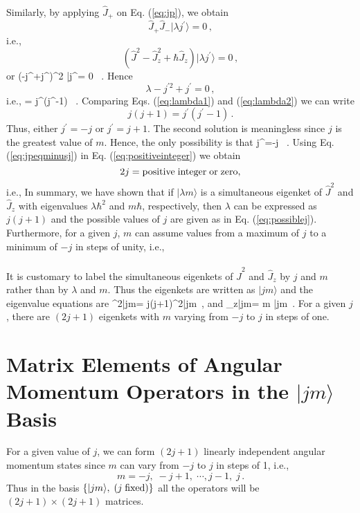 \paragraph{}
Similarly, by applying $\hat{J}_{+}$ on Eq. (\ref{eq:jp}), we obtain
\[ \hat{J}_{+}\hat{J}_{-} |\lambda j^{\prime}\rangle = 0 \, , \]
i.e.,
\[ \left( \hat{J}^2-\hat{J}_z^2 + \hbar\hat{J}_z\right)|\lambda j^{\prime}\rangle = 0 \, , \]
or
\be
(\lambda-j^{}+j^{\prime})\hbar^2 |\lambda j^{\prime}\rangle = 0 \, .
\ee
Hence
\[ \lambda - j^{\prime 2}+j^{\prime} =0\, , \]
i.e.,
\be
\lambda = j^{\prime}(j^{\prime}-1) \, .
\label{eq:lambda2}
\ee
Comparing Eqs. (\ref{eq:lambda1}) and (\ref{eq:lambda2}) we can write
\[ j(j+1) = j^{\prime}(j^{\prime}-1) \, . \]
Thus, either $j^{\prime}=-j$ or $j^{\prime}=j+1$. The second solution is meaningless since $j$ is the greatest value of $m$.
Hence, the only possibility is that
\be
j^{\prime}=-j \, .
\label{eq:jpeqminusj}
\ee
Using Eq. (\ref{eq:jpeqminusj}) in Eq. (\ref{eq:positiveinteger}) we obtain
\[ 2j= {\rm positive\; integer\; or\; zero}, \]
i.e.,
\be
{}
\label{eq:possiblej}
\ee
In summary, we have shown that if $|\lambda m\rangle$ is a simultaneous eigenket of $\hat{J}^2$ and $\hat{J}_z$ with eigenvalues $\lambda \hbar^2$ and $m\hbar$, respectively, then $\lambda$ can be expressed as $j(j+1)$ and the possible values of $j$
are given as in Eq. (\ref{eq:possiblej}). Furthermore, for a given $j$, $m$ can assume values from a maximum of $j$ to a minimum of $-j$ in steps of unity, i.e.,
\be
{}
\ee

\paragraph{}
It is customary to label the simultaneous eigenkets of $\hat{J}^2$ and $\hat{J}_z$ by $j$ and $m$ rather than by $\lambda$ 
and $m$. Thus the eigenkets are written as $|jm\rangle$ and the eigenvalue equations are
\be
{}^2|jm\rangle = j(j+1)\hbar^2|jm\rangle \, ,
\ee
and
\be
{}_z|jm\rangle = m \hbar |jm\rangle\, . 
\ee
For a given $j$, there are $(2j+1)$ eigenkets with $m$ varying from $-j$ to $j$ in steps of one.

\section{Matrix Elements of Angular Momentum Operators in the $|jm\rangle$ Basis}
For a given value of $j$, we can form $(2j+1)$ linearly independent angular momentum states since $m$ can
vary from $-j$ to $j$ in steps of 1, i.e.,
\[ m=-j,\; -j+1,\; \cdots , j-1,\; j\, .\]
Thus in the  basis $\{ |jm\rangle, \; (j\; {\rm fixed})\}$ all the operators will be $(2j+1)\times(2j+1)$ matrices.

